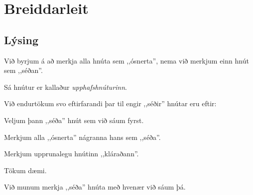 \section{Breiddarleit}
\subsection{Lýsing}
{
	{
		\item<1-> Við byrjum á að merkja alla hnúta sem ,,ósnerta'', nema við merkjum einn hnút sem ,,séðan''.
		\item<2-> Sá hnútur er kallaður \emph{upphafshnúturinn}.
		\item<3-> Við endurtökum svo eftirfarandi þar til engir ,,séðir'' hnútar eru eftir:
		{
			\item<4-> Veljum þann ,,séða'' hnút sem við sáum fyrst.
			\item<5-> Merkjum alla ,,ósnerta'' nágranna hans sem ,,séða''.
			\item<6-> Merkjum upprunalegu hnútinn ,,kláraðann''.
		}
		\item<7-> Tökum dæmi.
		\item<8-> Við munum merkja ,,séða'' hnúta með hvenær við sáum þá.
	}
}

